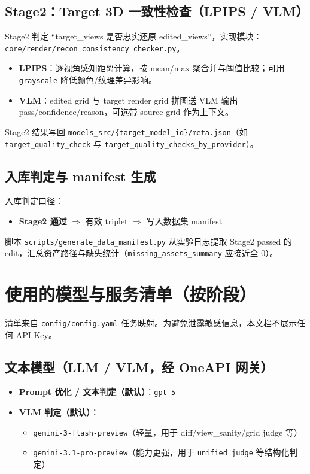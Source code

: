 \documentclass[UTF8,a4paper,11pt]{ctexart}
\begin{document}
\subsection{Stage2：Target 3D 一致性检查（LPIPS / VLM）}
Stage2 判定 ``target\_views 是否忠实还原 edited\_views''，实现模块：\texttt{core/render/recon\_consistency\_checker.py}。
\begin{itemize}
  \item \textbf{LPIPS}：逐视角感知距离计算，按 mean/max 聚合并与阈值比较；可用 \texttt{grayscale} 降低颜色/纹理差异影响。
  \item \textbf{VLM}：edited grid 与 target render grid 拼图送 VLM 输出 pass/confidence/reason，可选带 source grid 作为上下文。
\end{itemize}

Stage2 结果写回 \texttt{models\_src/\{target\_model\_id\}/meta.json}（如 \texttt{target\_quality\_check} 与 \texttt{target\_quality\_checks\_by\_provider}）。

\subsection{入库判定与 manifest 生成}
入库判定口径：
\begin{itemize}
  \item \textbf{Stage2 通过} $\Rightarrow$ 有效 triplet $\Rightarrow$ 写入数据集 manifest
\end{itemize}
脚本 \texttt{scripts/generate\_data\_manifest.py} 从实验日志提取 Stage2 passed 的 edit，汇总资产路径与缺失统计（\texttt{missing\_assets\_summary} 应接近全 0）。

\section{使用的模型与服务清单（按阶段）}
清单来自 \texttt{config/config.yaml} 任务映射。为避免泄露敏感信息，本文档不展示任何 API Key。

\subsection{文本模型（LLM / VLM，经 OneAPI 网关）}
\begin{itemize}
  \item \textbf{Prompt 优化 / 文本判定（默认）}：\texttt{gpt-5}
  \item \textbf{VLM 判定（默认）}：
  \begin{itemize}
    \item \texttt{gemini-3-flash-preview}（轻量，用于 diff/view\_sanity/grid judge 等）
    \item \texttt{gemini-3.1-pro-preview}（能力更强，用于 \texttt{unified\_judge} 等结构化判定）
  \end{itemize}
\end{itemize}
\end{document}

